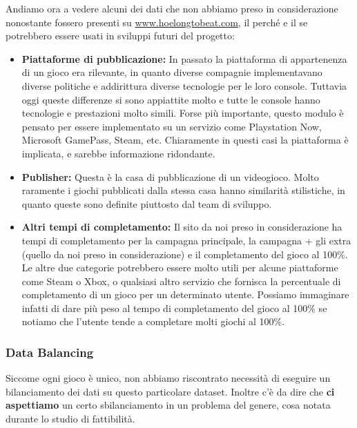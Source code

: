             Andiamo ora a vedere alcuni dei dati che non abbiamo preso in considerazione nonostante fossero presenti su \url{www.hoelongtobeat.com}, il perché e il se potrebbero essere usati in sviluppi futuri del progetto:
            \begin{itemize}
                \item \textbf{Piattaforme di pubblicazione:} In passato la piattaforma di appartenenza di un gioco era rilevante, in quanto diverse compagnie implementavano diverse politiche e addirittura diverse tecnologie per le loro console. Tuttavia oggi queste differenze si sono appiattite molto e tutte le console hanno tecnologie e prestazioni molto simili. Forse più importante, questo modulo è pensato per essere implementato su un servizio come Playstation Now, Microsoft GamePass, Steam, etc. Chiaramente in questi casi la piattaforma è implicata, e sarebbe informazione ridondante.
                
                \item \textbf{Publisher:} Questa è la casa di pubblicazione di un videogioco. Molto raramente i giochi pubblicati dalla stessa casa hanno similarità stilistiche, in quanto queste sono definite piuttosto dal team di sviluppo.
                
                \item \textbf{Altri tempi di completamento:} Il sito da noi preso in considerazione ha tempi di completamento per la campagna principale, la campagna + gli extra (quello da noi preso in considerazione) e il completamento del gioco al 100\%. Le altre due categorie potrebbero essere molto utili per alcune piattaforme come Steam o Xbox, o qualsiasi altro servizio che fornisca la percentuale di completamento di un gioco per un determinato utente. Possiamo immaginare infatti di dare più peso al tempo di completamento del gioco al 100\% se notiamo che l'utente tende a completare molti giochi al 100\%.
            \end{itemize}
            
        \subsubsection{Data Balancing}
            Siccome ogni gioco è unico, non abbiamo riscontrato necessità di eseguire un bilanciamento dei dati su questo particolare dataset. Inoltre c'è da dire che \textbf{ci aspettiamo} un certo sbilanciamento in un problema del genere, cosa notata durante lo studio di fattibilità.